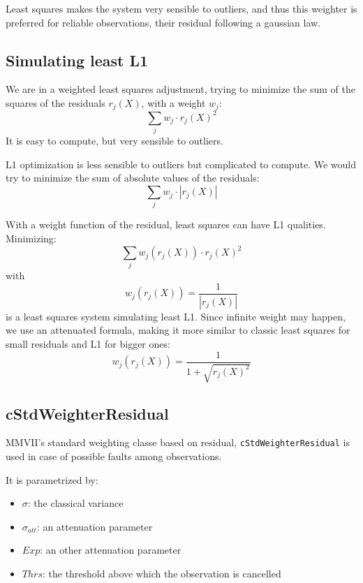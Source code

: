 Least squares makes the system very sensible to outliers, and thus this weighter
is preferred for reliable observations, their residual following a gaussian law.

\subsection{Simulating least L1}

We are in a weighted least squares adjustment, trying to minimize the sum of the squares
of the residuals $r_j(X)$, with a weight $w_j$:
\begin{equation*}
	\sum_j w_j \cdot r_j(X)^2 
\end{equation*}
It is easy to compute, but very sensible to outliers.

L1 optimization is less sensible to outliers but complicated to compute.
We would try to minimize the sum of absolute values of the residuals:
\begin{equation*}
	\sum_j w_j \cdot | r_j(X) |
\end{equation*}

With a weight function of the residual, least squares can have L1 qualities.
Minimizing:
\begin{equation*}
	\sum_j w_j\left( r_j(X) \right) \cdot r_j(X)^2
\end{equation*}
with
\begin{equation*}
	w_j\left( r_j(X) \right) = \frac{1}{|r_j(X)|}
\end{equation*}
is a least squares system simulating least L1. Since infinite weight may happen, we use an attenuated formula,
making it more similar to classic least squares for small residuals and L1 for bigger ones:
\begin{equation*}
	w_j\left( r_j(X) \right) = \frac{1}{ 1 + \sqrt{r_j(X)^2}}
\end{equation*}


\subsection{cStdWeighterResidual}
MMVII's standard weighting classe based on residual, \texttt{cStdWeighterResidual} is used in case
of possible faults among observations.

It is parametrized by:

\begin{itemize}
  \item $\sigma$: the classical variance
  \item $\sigma_{att}$: an attenuation parameter
  \item $Exp$: an other attenuation parameter
  \item $Thrs$: the threshold above which the observation is cancelled
\end{itemize}

